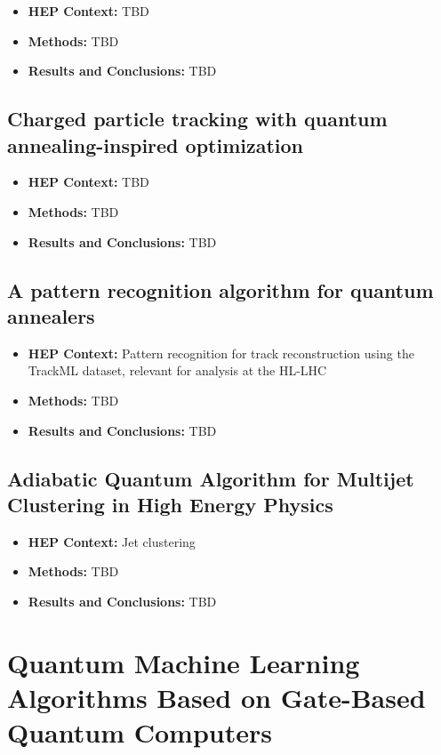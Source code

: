 \begin{itemize}
	\item \textbf{HEP Context: }TBD
	\item \textbf{Methods: }TBD
	\item \textbf{Results and Conclusions: }TBD
\end{itemize}\subsection{Charged particle tracking with quantum annealing-inspired optimization~\cite{Zlokapa:2019tkn}}
\begin{itemize}
	\item \textbf{HEP Context: }TBD
	\item \textbf{Methods: }TBD
	\item \textbf{Results and Conclusions: }TBD
\end{itemize}\subsection{A pattern recognition algorithm for quantum annealers~\cite{Bapst:2019llh}}
\begin{itemize}
	\item \textbf{HEP Context: }Pattern recognition for track reconstruction using the TrackML dataset, relevant for analysis at the HL-LHC
	\item \textbf{Methods: }TBD
	\item \textbf{Results and Conclusions: }TBD
\end{itemize}\subsection{Adiabatic Quantum Algorithm for Multijet Clustering in High Energy Physics~\cite{Pires:2020urc}}
\begin{itemize}
	\item \textbf{HEP Context: }Jet clustering
	\item \textbf{Methods: }TBD
	\item \textbf{Results and Conclusions: }TBD
\end{itemize}

\section{Quantum Machine Learning Algorithms Based on Gate-Based Quantum Computers}

